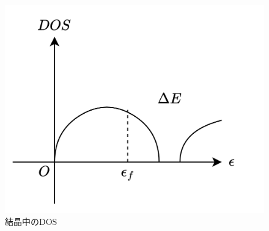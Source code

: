 \begin{figure}
	\centering
	\includegraphics[width=0.6\linewidth]{src/figures/crystal-dos/crystal-dos.png}
	\caption{結晶中のDOS}\label{fig:crystal-dos}
\end{figure}
